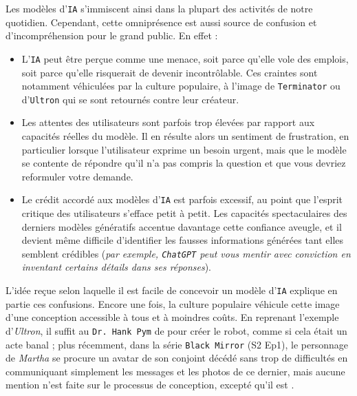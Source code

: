 		Les modèles d'\texttt{IA} s'immiscent ainsi dans la plupart des activités de notre quotidien.
		Cependant, cette omniprésence est aussi source de confusion et d'incompréhension pour le grand public.
		En effet :
		\begin{itemize}
			\item L'\texttt{IA} peut être perçue comme une menace, soit parce qu'elle vole des emplois, soit parce qu'elle risquerait de devenir incontrôlable.
			Ces craintes sont notamment véhiculées par la culture populaire, à l'image de \texttt{Terminator} ou d'\texttt{Ultron} qui se sont retournés contre leur créateur.
			\item Les attentes des utilisateurs sont parfois trop élevées par rapport aux capacités réelles du modèle.
			Il en résulte alors un sentiment de frustration, en particulier lorsque l'utilisateur exprime un besoin urgent, mais que le modèle se contente de répondre qu'il n'a pas compris la question et que vous devriez reformuler votre demande.
			\item Le crédit accordé aux modèles d'\texttt{IA} est parfois excessif, au point que l'esprit critique des utilisateurs s'efface petit à petit.
			Les capacités spectaculaires des derniers modèles génératifs accentue davantage cette confiance aveugle, et il devient même difficile d'identifier les fausses informations générées tant elles semblent crédibles (\textit{par exemple, \texttt{ChatGPT} peut vous mentir avec conviction en inventant certains détails dans ses réponses}). 
		\end{itemize}
		
		L'idée reçue selon laquelle il est facile de concevoir un modèle d'\texttt{IA} explique en partie ces confusions.
		Encore une fois, la culture populaire véhicule cette image d'une conception accessible à tous et à moindres coûts.
		En reprenant l'exemple d'\textit{Ultron}, il suffit au \texttt{Dr. Hank Pym} de  pour créer le robot, comme si cela était un acte banal ; plus récemment, dans la série \texttt{Black Mirror} (S2 Ep1), le personnage de \textit{Martha} se procure un avatar de son conjoint décédé sans trop de difficultés en communiquant simplement les messages et les photos de ce dernier, mais aucune mention n'est faite sur le processus de conception, excepté qu'il est .
		\newline
		
